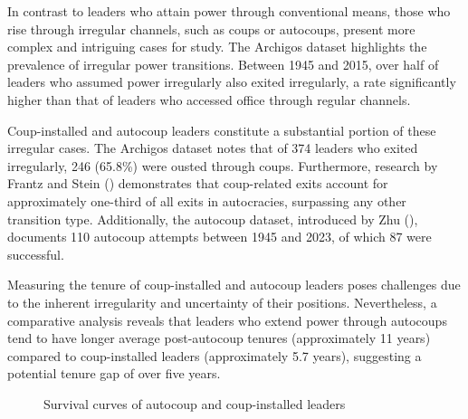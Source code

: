 \documentclass[
  12pt,
]{article}
\begin{document}
In contrast to leaders who attain power through conventional means,
those who rise through irregular channels, such as coups or autocoups,
present more complex and intriguing cases for study. The Archigos
dataset highlights the prevalence of irregular power transitions.
Between 1945 and 2015, over half of leaders who assumed power
irregularly also exited irregularly, a rate significantly higher than
that of leaders who accessed office through regular channels.

Coup-installed and autocoup leaders constitute a substantial portion of
these irregular cases. The Archigos dataset notes that of 374 leaders
who exited irregularly, 246 (65.8\%) were ousted through coups.
Furthermore, research by Frantz and Stein
() demonstrates that coup-related exits
account for approximately one-third of all exits in autocracies,
surpassing any other transition type. Additionally, the autocoup
dataset, introduced by Zhu (), documents 110
autocoup attempts between 1945 and 2023, of which 87 were successful.

Measuring the tenure of coup-installed and autocoup leaders poses
challenges due to the inherent irregularity and uncertainty of their
positions. Nevertheless, a comparative analysis reveals that leaders who
extend power through autocoups tend to have longer average post-autocoup
tenures (approximately 11 years) compared to coup-installed leaders
(approximately 5.7 years), suggesting a potential tenure gap of over
five years.

\begin{figure}


\caption{\label{fig-logrank}Survival curves of autocoup and
coup-installed leaders}

\end{figure}%
\end{document}
